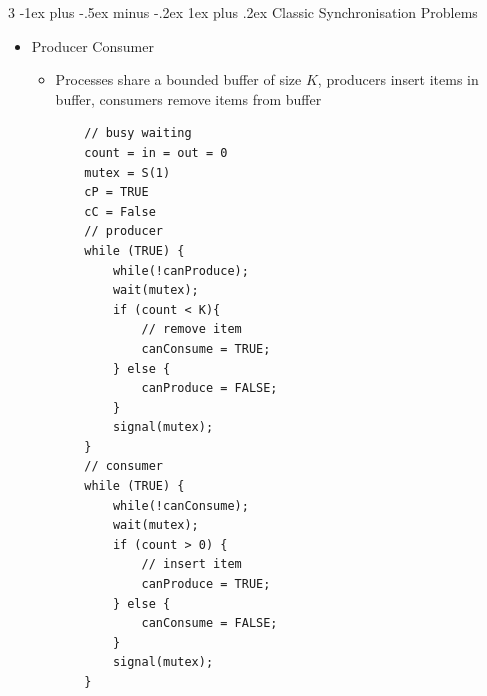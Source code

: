 \documentclass[10pt, landscape]{article}
\makeatletter
\renewcommand{\subsection}{\@startsection{subsection}{3}{0mm}%
                                {-1ex plus -.5ex minus -.2ex}%
                                {1ex plus .2ex}%
                                {\normalfont\small\bfseries}}%
\makeatother
\begin{document}
\begin{multicols*}{3}
\subsection{Classic Synchronisation Problems}
\begin{itemize}
    \item Producer Consumer
    \begin{itemize}
        \item Processes share a bounded buffer of size $K$, producers insert items in buffer, consumers remove items from buffer
        \begin{verbatim}
    // busy waiting
    count = in = out = 0
    mutex = S(1)
    cP = TRUE
    cC = False
    // producer
    while (TRUE) {
        while(!canProduce);
        wait(mutex);
        if (count < K){
            // remove item
            canConsume = TRUE;
        } else {
            canProduce = FALSE;
        }
        signal(mutex);
    }
    // consumer
    while (TRUE) {
        while(!canConsume);
        wait(mutex);
        if (count > 0) {
            // insert item
            canProduce = TRUE;
        } else {
            canConsume = FALSE;
        }
        signal(mutex);
    }


\end{verbatim}
\end{itemize}
\end{itemize}
\end{multicols*}
\end{document}
